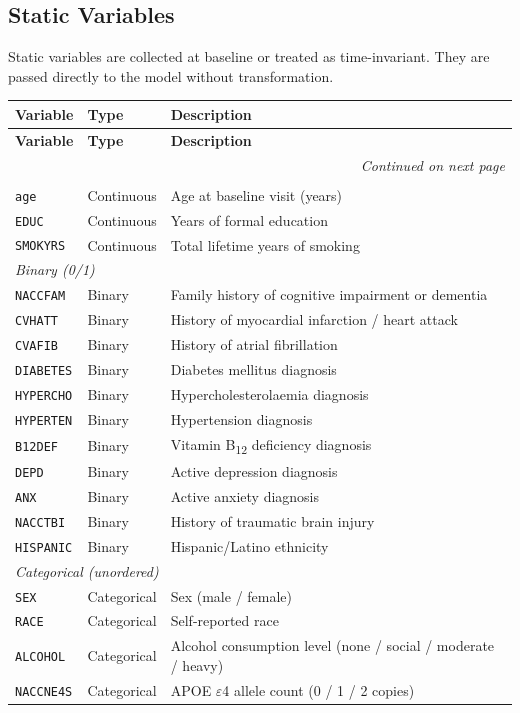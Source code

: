 \documentclass[11pt]{article}
\begin{document}
\subsection{Static Variables}

Static variables are collected at baseline or treated as time-invariant.  They are passed directly to the model without transformation.

\begin{longtable}{@{}lll@{}}
\toprule
\textbf{Variable} & \textbf{Type} & \textbf{Description} \\
\midrule
\endfirsthead
\toprule
\textbf{Variable} & \textbf{Type} & \textbf{Description} \\
\midrule
\endhead
\midrule
\multicolumn{3}{r}{\small\emph{Continued on next page}}\\
\endfoot
\bottomrule
\endlastfoot
\multicolumn{3}{l}{\textit{Numeric}} \\[2pt]
\texttt{age}     & Continuous & Age at baseline visit (years) \\
\texttt{EDUC}    & Continuous & Years of formal education \\
\texttt{SMOKYRS} & Continuous & Total lifetime years of smoking \\[6pt]
\multicolumn{3}{l}{\textit{Binary (0/1)}} \\[2pt]
\texttt{NACCFAM}  & Binary & Family history of cognitive impairment or dementia \\
\texttt{CVHATT}   & Binary & History of myocardial infarction / heart attack \\
\texttt{CVAFIB}   & Binary & History of atrial fibrillation \\
\texttt{DIABETES} & Binary & Diabetes mellitus diagnosis \\
\texttt{HYPERCHO} & Binary & Hypercholesterolaemia diagnosis \\
\texttt{HYPERTEN} & Binary & Hypertension diagnosis \\
\texttt{B12DEF}   & Binary & Vitamin B\textsubscript{12} deficiency diagnosis \\
\texttt{DEPD}     & Binary & Active depression diagnosis \\
\texttt{ANX}      & Binary & Active anxiety diagnosis \\
\texttt{NACCTBI}  & Binary & History of traumatic brain injury \\
\texttt{HISPANIC} & Binary & Hispanic/Latino ethnicity \\[6pt]
\multicolumn{3}{l}{\textit{Categorical (unordered)}} \\[2pt]
\texttt{SEX}      & Categorical & Sex (male / female) \\
\texttt{RACE}     & Categorical & Self-reported race \\
\texttt{ALCOHOL}  & Categorical & Alcohol consumption level (none / social / moderate / heavy) \\
\texttt{NACCNE4S} & Categorical & APOE $\varepsilon$4 allele count (0 / 1 / 2 copies) \\
\end{longtable}
\end{document}

